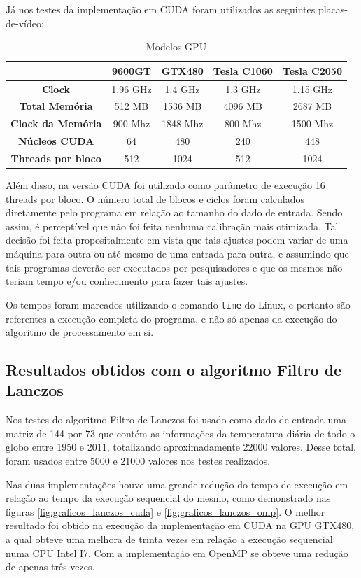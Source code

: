Já nos testes da implementação em CUDA foram utilizados as seguintes placas-de-vídeo:

\begin{table}[H]
\caption{Modelos GPU}
\begin{center}
\begin{tabular}{ccccc}
 & \textbf{9600GT} & \textbf{GTX480} & \textbf{Tesla C1060} & \textbf{Tesla C2050}\\
\hline\hline
\textbf{Clock}				& 1.96 GHz	& 1.4 GHz 	& 1.3 GHz	& 1.15 GHz \\
\textbf{Total Memória}		& 512 MB		& 1536 MB	& 4096 MB	& 2687 MB \\
\textbf{Clock da Memória}	& 900 Mhz	& 1848 Mhz 	& 800 Mhz	& 1500 Mhz \\
\textbf{Núcleos CUDA}		& 64			& 480		& 240		& 448 \\
\textbf{Threads por bloco}	& 512		& 1024		& 512		& 1024
\end{tabular} 
\end{center}
\end{table}

Além disso, na versão CUDA foi utilizado como parâmetro de execução 16 threads por bloco. O número total de blocos e ciclos foram calculados diretamente pelo programa em relação ao tamanho do dado de entrada. Sendo assim, é perceptível que não foi feita nenhuma calibração mais otimizada. Tal decisão foi feita propositalmente em vista que tais ajustes podem variar de uma máquina para outra ou até mesmo de uma entrada para outra, e assumindo que tais programas deverão ser executados por pesquisadores e que os mesmos não teriam tempo e/ou conhecimento para fazer tais ajustes.

Os tempos foram marcados utilizando o comando \texttt{time} do Linux, e portanto são referentes a execução completa do programa, e não só apenas da execução do algoritmo de processamento em si.

\subsection{Resultados obtidos com o algoritmo Filtro de Lanczos}

Nos testes do algoritmo Filtro de Lanczos foi usado como dado de entrada uma matriz de 144 por 73 que contém as informações da temperatura diária de todo o globo entre 1950 e 2011, totalizando aproximadamente 22000 valores. Desse total, foram usados entre 5000 e 21000 valores nos testes realizados.

Nas duas implementações houve uma grande redução do tempo de execução em relação ao tempo da execução sequencial do mesmo, como demonstrado nas figuras \ref{fig:graficos_lanczos_cuda} e \ref{fig:graficos_lanczos_omp}. O melhor resultado foi obtido na execução da implementação em CUDA na GPU GTX480, a qual obteve uma melhora de trinta vezes em relação a execução sequencial numa CPU Intel I7. Com a implementação em OpenMP se obteve uma redução de apenas três vezes.

